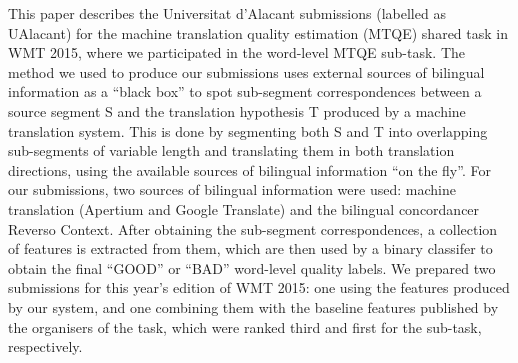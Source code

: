 This paper describes the Universitat d'Alacant submissions (labelled as UAlacant) for the machine translation quality estimation (MTQE) shared task in WMT 2015, where we participated in the word-level MTQE sub-task. The method we used to produce our submissions uses external sources of bilingual information as a ``black box'' to spot sub-segment correspondences between a source segment S and the translation hypothesis T produced by a machine translation system. This is done by segmenting both S and T into overlapping sub-segments of variable length and translating them in both translation directions, using the available sources of bilingual information ``on the fly''. For our submissions, two sources of bilingual information were used: machine translation (Apertium and Google Translate) and the bilingual concordancer Reverso Context. After obtaining the sub-segment correspondences, a collection of features is extracted from them, which are then used by a binary classifer to obtain the final ``GOOD'' or ``BAD'' word-level quality labels. We prepared two submissions for this year's edition of WMT 2015: one using the features produced by our system, and one combining them with the baseline features published by the organisers of the task, which were ranked third and first for the sub-task, respectively.
